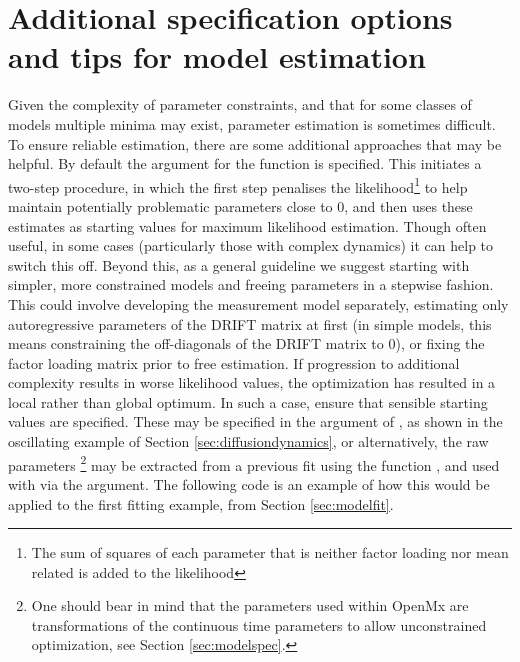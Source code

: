 \documentclass[nojss]{jss}\usepackage[]{graphicx}\usepackage[]{color}
\begin{document}
\section[Tips]{Additional specification options and tips for model estimation} \label{sec:tips}\nopagebreak
Given the complexity of parameter constraints, and that for some classes of models multiple minima may exist, parameter estimation is sometimes difficult. To ensure reliable estimation, there are some additional approaches that may be helpful. By default the argument  for the  function is specified. This initiates a two-step procedure, in which the first step penalises the likelihood\footnote{The sum of squares of each parameter that is neither factor loading nor mean related is added to the likelihood} to help maintain potentially problematic parameters close to 0, and then uses these estimates as starting values for maximum likelihood estimation. Though often useful, in some cases (particularly those with complex dynamics) it can help to switch this off. Beyond this, as a general guideline we suggest starting with simpler, more constrained models and freeing parameters in a stepwise fashion. This could involve developing the measurement model separately, estimating only autoregressive parameters of the DRIFT matrix at first (in simple models, this means constraining the off-diagonals of the DRIFT matrix to 0), or fixing the factor loading matrix prior to free estimation. If progression to additional complexity results in worse likelihood values, the optimization has resulted in a local rather than global optimum. In such a case, ensure that sensible starting values are specified. These may be specified in the  argument of , as shown in the oscillating example of Section \ref{sec:diffusiondynamics}, or alternatively, the raw  parameters \footnote{One should bear in mind that the parameters used within OpenMx are transformations of the continuous time parameters to allow unconstrained optimization, see Section \ref{sec:modelspec}.} may be extracted from a previous fit using the  function , and used with  via the  argument. The following code is an example of how this would be applied to the first fitting example, from Section \ref{sec:modelfit}.

\begin{Schunk}
\end{Schunk}
\end{document}
